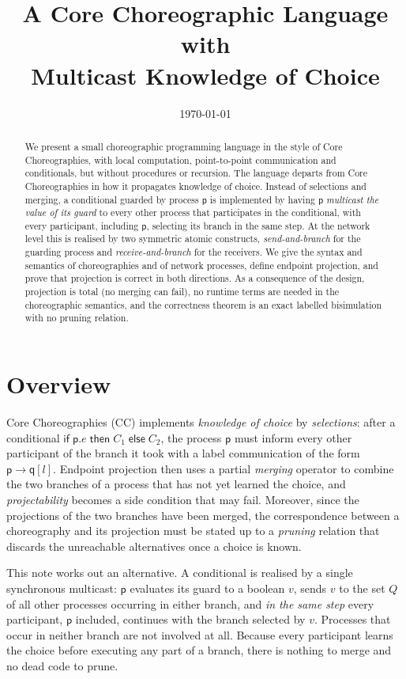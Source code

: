\documentclass[11pt]{article}
\title{A Core Choreographic Language with\\Multicast Knowledge of Choice}
\author{}
\date{\today}
\theoremstyle{plain}
\theoremstyle{definition}
\theoremstyle{remark}
\newcommand{\kw}[1]{\mathsf{#1}}
\newcommand{\kif}{\kw{if}\;}
\newcommand{\kthen}{\;\kw{then}\;}
\newcommand{\kelse}{\;\kw{else}\;}
\newcommand{\pp}{\mathsf{p}}
\newcommand{\qq}{\mathsf{q}}
\newcommand{\ifcond}[3]{\kif #1 \kthen #2 \kelse #3}
\begin{document}
\maketitle

\begin{abstract}
  We present a small choreographic programming language in the style of Core
  Choreographies, with local computation, point-to-point communication and
  conditionals, but without procedures or recursion.  The language departs from
  Core Choreographies in how it propagates knowledge of choice.  Instead of
  selections and merging, a conditional guarded by process $\pp$ is
  implemented by having $\pp$ \emph{multicast the value of its guard} to every
  other process that participates in the conditional, with every participant,
  including $\pp$, selecting its branch in the same step.  At the network level
  this is realised by two symmetric atomic constructs, \emph{send-and-branch}
  for the guarding process and \emph{receive-and-branch} for the receivers.  We
  give the syntax and semantics of choreographies and of network processes,
  define endpoint projection, and prove that projection is correct in both
  directions.  As a consequence of the design, projection is total (no merging
  can fail), no runtime terms are needed in the choreographic semantics, and
  the correctness theorem is an exact labelled bisimulation with no pruning
  relation.
\end{abstract}

\section*{Overview}

Core Choreographies (CC) implements \emph{knowledge of choice} by
\emph{selections}: after a conditional $\ifcond{\pp.e}{C_1}{C_2}$, the process
$\pp$ must inform every other participant of the branch it took with a label
communication of the form $\pp \to \qq[l]$.  Endpoint projection then uses a
partial \emph{merging} operator to combine the two branches of a process that
has not yet learned the choice, and \emph{projectability} becomes a side
condition that may fail.  Moreover, since the projections of the two branches
have been merged, the correspondence between a choreography and its projection
must be stated up to a \emph{pruning} relation that discards the unreachable
alternatives once a choice is known.

This note works out an alternative.  A conditional is realised by a single
synchronous multicast: $\pp$ evaluates its guard to a boolean $v$, sends $v$
to the set $Q$ of all other processes occurring in either branch, and
\emph{in the same step} every participant, $\pp$ included, continues with the
branch selected by $v$.  Processes that occur in neither branch are not
involved at all.  Because every participant learns the choice before executing
any part of a branch, there is nothing to merge and no dead code to prune.
\end{document}
